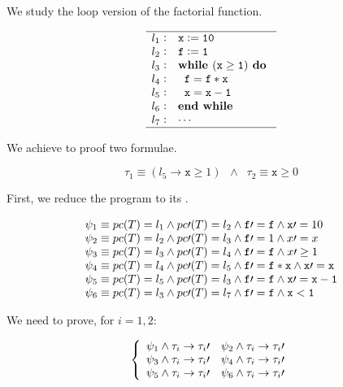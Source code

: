 


We study the loop version of the factorial function.


\[
	\begin{array}{l@{\hspace{0.3em}}c@{\hspace{1em}}l}
	\hline
		l_1 & : & \mathtt{x := 10} \\
		l_2 & : & \mathtt{f := 1} \\
		l_3 & : & \mathtt{\textbf{while } (x\geq 1) \textbf{ do }} \\
		l_4 & : & \mathtt{\;\;f = f*x} \\
		l_5 & : & \mathtt{\;\;x=x-1} \\ 	
		l_6 & : & \mathtt{\textbf{end while}}\\
		l_7 & : & \mathtt{\cdots}\\
	\hline
	\end{array}
\]
\label{simple:example}




We achieve to proof two formulae.

\[\tau_1 \equiv (l_5 \to \mathtt{x}\geq 1) \;\; \wedge \;\; \tau_2 \equiv \mathtt{x} \geq 0\]

First, we reduce the program to its \VC.


\[
	\begin{array}{l}
		 \psi_1 \equiv pc(T) = l_1 \wedge pc\prime (T) = l_2 \wedge \mathtt{f\prime =f} \wedge \mathtt{x}\prime  = 10\\
		 \psi_2 \equiv pc(T) = l_2 \wedge pc\prime (T) = l_3 \wedge \mathtt{f}\prime  = 1 \wedge x\prime =x\\
		 \psi_3 \equiv pc(T) = l_3 \wedge pc\prime (T) = l_4 \wedge \mathtt{f\prime =f} \wedge x\prime \geq 1\\
		 \psi_4 \equiv pc(T) = l_4 \wedge pc\prime (T) = l_5 \wedge \mathtt{f}\prime  = \mathtt{f*x} \wedge \mathtt{x\prime =x}\\
		 \psi_5 \equiv pc(T) = l_5 \wedge pc\prime (T) = l_3 \wedge \mathtt{f\prime =f} \wedge \mathtt{x\prime =x-1}\\
		 \psi_6 \equiv pc(T) = l_3 \wedge pc\prime (T) = l_7 \wedge \mathtt{f\prime =f} \wedge \mathtt{x<1}
	\end{array}
\]

We need to prove, for $i=1,2$:

\[
	\left\{
		\begin{array}{lr}
			\psi_1 \wedge \tau_i \to \tau_i\prime  &
			\psi_2 \wedge \tau_i \to \tau_i\prime \\
			\psi_3 \wedge \tau_i \to \tau_i\prime  &
			\psi_4 \wedge \tau_i \to \tau_i\prime \\
			\psi_5 \wedge \tau_i \to \tau_i\prime  &
			\psi_6 \wedge \tau_i \to \tau_i\prime 
		\end{array}
	\right.
\]

